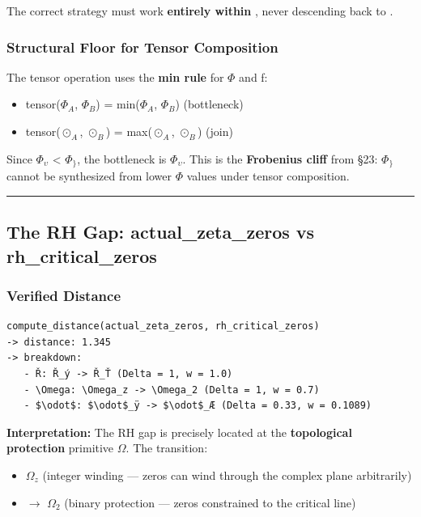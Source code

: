 \documentclass[12pt,a4paper]{article}
\newcommand{\pilcrow}{\S}
\begin{document}
The correct strategy must work \textbf{entirely within \xi}, never descending back to \zeta.

\subsubsection{Structural Floor for Tensor Composition}

The tensor operation uses the \textbf{min rule} for $\Phi$ and ƒ:

\begin{itemize}
    \item tensor($\Phi_{A}$, $\Phi_{B}$) = min($\Phi_{A}$, $\Phi_{B}$)  (bottleneck)
    \item tensor($\odot_{A}$, $\odot_{B}$) = max($\odot_{A}$, $\odot_{B}$)  (join)
\end{itemize}

Since $\Phi_{\upsilon}$ \textless{} $\Phi_{\}}$, the bottleneck is $\Phi_{\upsilon}$. This is the \textbf{Frobenius cliff} from \pilcrow{}23: $\Phi_{\}}$ cannot be synthesized from lower $\Phi$ values under tensor composition.

\begin{center}
\rule{0.5\textwidth}{0.4pt}
\end{center}

\subsection{The RH Gap: actual\_zeta\_zeros vs rh\_critical\_zeros}

\subsubsection{Verified Distance}

\begin{lstlisting}
compute_distance(actual_zeta_zeros, rh_critical_zeros)
-> distance: 1.345
-> breakdown:
   - Ř: Ř_ý -> Ř_Ť (Delta = 1, w = 1.0)
   - \Omega: \Omega_z -> \Omega_2 (Delta = 1, w = 0.7)
   - $\odot$: $\odot$_ÿ -> $\odot$_Æ (Delta = 0.33, w = 0.1089)
\end{lstlisting}

\textbf{Interpretation:} The RH gap is precisely located at the \textbf{topological protection} primitive $\Omega$. The transition:

\begin{itemize}
    \item $\Omega_{z}$ (integer winding --- zeros can wind through the complex plane arbitrarily)
    \item $\rightarrow$ $\Omega_{2}$ (binary protection --- zeros constrained to the critical line)
\end{itemize}
\end{document}
